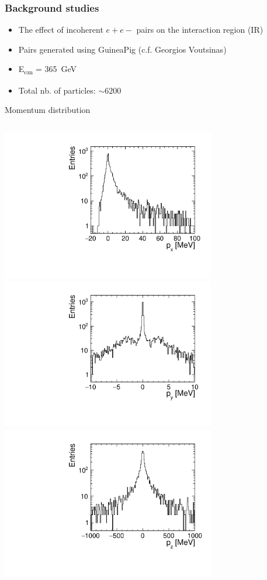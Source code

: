 \documentclass[aspectratio=169, hyperref={colorlinks=true,pdfpagelabels=false,linkcolor=black}, xcolor=dvipsnames,10pt]{beamer}
\begin{document}
\begin{frame}
	\frametitle{Background studies}

	\begin{itemize}
	\item The effect of incoherent $e+e-$ pairs on the interaction region (IR)
	\item Pairs generated using GuineaPig (c.f. Georgios Voutsinas)
	\item E\textsubscript{cm} = 365~GeV
	\item Total nb. of particles: $\sim6200$
	\end{itemize}		
	
	\begin{block}{Momentum distribution}
	\begin{columns}
		\centering
		\includegraphics[width=0.7\textwidth]{../figures/incoherentPairs_px.pdf} \\									\includegraphics[width=0.7\textwidth]{../figures/incoherentPairs_py.pdf}
		\centering
		\includegraphics[width=0.7\textwidth]{../figures/incoherentPairs_pz.pdf}  \\

\end{columns}
\end{block}
\end{frame}
\end{document}
